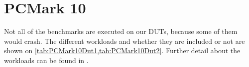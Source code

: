\section{PCMark 10}
Not all of the benchmarks are executed on our DUTs, because some of them would crash. The different workloads and whether they are included or not are shown on \cref{tab:PCMark10Dut1,tab:PCMark10Dut2}. Further detail about the workloads can be found in \cite{pcmark}.

